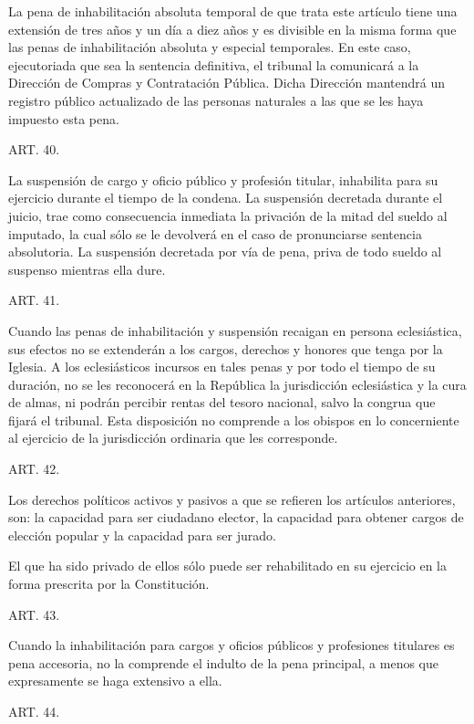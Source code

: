     La pena de inhabilitación absoluta temporal de que trata este artículo tiene una extensión de tres años y un día a diez años y es divisible en la misma forma que las penas de inhabilitación absoluta y especial temporales.
    En este caso, ejecutoriada que sea la sentencia definitiva, el tribunal la comunicará a la Dirección de Compras y Contratación Pública. Dicha Dirección mantendrá un registro público actualizado de las personas naturales a las que se les haya impuesto esta pena.




    ART. 40.

    La suspensión de cargo y oficio público y profesión titular, inhabilita para su ejercicio durante el tiempo de la condena.
    La suspensión decretada durante el juicio, trae como consecuencia inmediata la privación de la mitad del sueldo al imputado, la cual sólo se le devolverá en el caso de pronunciarse sentencia absolutoria.
    La suspensión decretada por vía de pena, priva de todo sueldo al suspenso mientras ella dure.

    ART. 41.

    Cuando las penas de inhabilitación y suspensión recaigan en persona eclesiástica, sus efectos no se extenderán a los cargos, derechos y honores que tenga por la Iglesia. A los eclesiásticos incursos en tales penas y por todo el tiempo de su duración, no se les reconocerá en la República la jurisdicción eclesiástica y la cura de almas, ni podrán percibir rentas del tesoro nacional, salvo la congrua que fijará el tribunal.
    Esta disposición no comprende a los obispos en lo concerniente al ejercicio de la jurisdicción ordinaria que les corresponde.


    ART. 42.

    Los derechos políticos activos y pasivos a que se refieren los artículos anteriores, son: la capacidad para ser ciudadano elector, la capacidad para obtener cargos de elección popular y la capacidad para ser jurado.   

    El que ha sido privado de ellos sólo puede ser rehabilitado en su ejercicio en la forma prescrita por la Constitución.




    ART. 43.

    Cuando la inhabilitación para cargos y oficios públicos y profesiones titulares es pena accesoria, no la comprende el indulto de la pena principal, a menos que expresamente se haga extensivo a ella.


    ART. 44.

